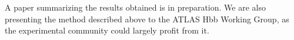 \documentclass[10pt,a4paper]{book}
\begin{document}
A paper summarizing the results obtained is in preparation. We are also presenting the method described above to the ATLAS Hbb Working Group, as the experimental community could largely profit from it.

\end{document}
